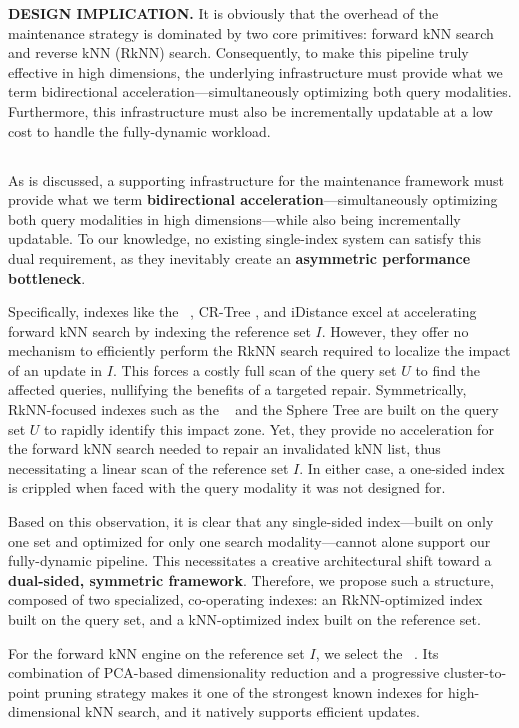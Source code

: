 \noindent\textbf{DESIGN IMPLICATION.}
It is obviously that the overhead of the maintenance strategy is dominated by two core primitives: forward kNN search and reverse kNN (RkNN) search. Consequently, to make this pipeline truly effective in high dimensions, the underlying infrastructure must provide what we term bidirectional acceleration—simultaneously optimizing both query modalities. Furthermore, this infrastructure must also be incrementally updatable at a low cost to handle the fully-dynamic workload. 

\subsection{\dualtree}
\label{subsec:dualtree}
As is discussed, a supporting infrastructure for the maintenance framework must provide what we term \textbf{bidirectional acceleration}---simultaneously optimizing both query modalities in high dimensions---while also being incrementally updatable. To our knowledge, no existing single-index system can satisfy this dual requirement, as they inevitably create an \textbf{asymmetric performance bottleneck}.

Specifically, indexes like the \deltatree\ \cite{cui2003contorting}, CR-Tree \cite{kim2001optimizing}, and iDistance \cite{jagadish2005idistance} excel at accelerating forward kNN search by indexing the reference set $I$. However, they offer no mechanism to efficiently perform the RkNN search required to localize the impact of an update in $I$. This forces a costly full scan of the query set $U$ to find the affected queries, nullifying the benefits of a targeted repair. Symmetrically, RkNN-focused indexes such as the \hdrtree\ \cite{yang2014continuous, ukey2024cluster, ukey2023efficient} and the Sphere Tree \cite{yu2010high, yang2014continuous} are built on the query set $U$ to rapidly identify this impact zone. Yet, they provide no acceleration for the forward kNN search needed to repair an invalidated kNN list, thus necessitating a linear scan of the reference set $I$. In either case, a one-sided index is crippled when faced with the query modality it was not designed for.

Based on this observation, it is clear that any single-sided index---built on only one set and optimized for only one search modality---cannot alone support our fully-dynamic pipeline. This necessitates a creative architectural shift toward a \textbf{dual-sided, symmetric framework}. Therefore, we propose such a structure, composed of two specialized, co-operating indexes: an RkNN-optimized index built on the query set, and a kNN-optimized index built on the reference set. 

For the forward kNN engine on the reference set $I$, we select the \textbf{\deltatree}~\cite{cui2003contorting}. Its combination of PCA-based dimensionality reduction and a progressive cluster-to-point pruning strategy makes it one of the strongest known indexes for high-dimensional kNN search, and it natively supports efficient updates.

